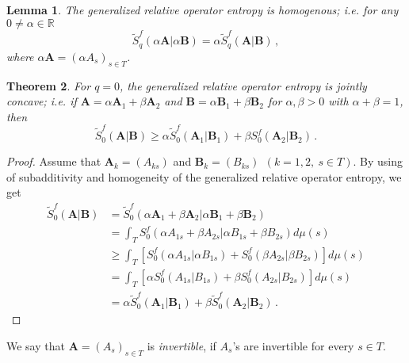 \documentclass[12pt, reqno]{amsart}
\newtheorem{theorem}{Theorem}[section]
\newtheorem{lemma}[theorem]{Lemma}
\theoremstyle{definition}
\theoremstyle{remark}
\numberwithin{equation}{section}
\begin{document}
\begin{lemma}\label{2.9}
The generalized relative operator entropy is homogenous; i.e. for any $0\neq \alpha \in \mathbb R$
$$
\widetilde{S}_q^f(\alpha\mathbf A|\alpha\mathbf B)=\alpha \widetilde{S}_q^f(\mathbf A|\mathbf B)\,,
$$
where $\alpha\mathbf A=(\alpha A_s)_{s\in T}$.
\end{lemma}
\begin{theorem}\label{t4}
For $q=0$, the generalized relative operator entropy is jointly concave; i.e. if $\mathbf{A}=\alpha \mathbf{A}_1+\beta \mathbf{A}_2$ and $\mathbf{B}=\alpha \mathbf{B}_1+\beta \mathbf{B}_2$ for $\alpha, \beta >0$ with $\alpha+\beta=1$, then
$$
\widetilde{S}_0^f(\mathbf{A}|\mathbf{B}) \ge \alpha \widetilde{S}_0^f(\mathbf{A}_1|\mathbf{B}_1)+\beta S_0^f(\mathbf{A}_2|\mathbf{B}_2)\,.
$$
\end{theorem}
\begin{proof}
Assume that $\mathbf{A}_k=(A_{ks})$ and $\mathbf{B}_k=(B_{ks})~~(k=1, 2,~s\in T)$. By using of subadditivity and homogeneity of the generalized relative operator entropy, we get
\begin{align*}
\widetilde{S}_0^f(\mathbf{A}|\mathbf{B})&=\widetilde{S}_0^f(\alpha \mathbf{A}_1+\beta \mathbf{A}_2|\alpha \mathbf{B}_1+\beta \mathbf{B}_2)\\
&=\int_T S_0^f(\alpha A_{1s}+\beta A_{2s}|\alpha B_{1s}+\beta B_{2s})d\mu(s)\\
& \ge \int_T\left[S_0^f(\alpha A_{1s}|\alpha B_{1s})+S_0^f(\beta A_{2s}|\beta B_{2s})\right]d\mu(s)\\
& = \int_T\left[\alpha S_0^f(A_{1s}|B_{1s})+\beta S_0^f(A_{2s}|B_{2s})\right]d\mu(s)\\
&= \alpha \widetilde{S}_0^f(\mathbf{A}_1|\mathbf{B}_1)+\beta \widetilde{S}_0^f(\mathbf{A}_2|\mathbf{B}_2)\,.
\end{align*}
\end{proof}

We say that $\mathbf{A}=(A_s)_{s\in T}$ is \textit{invertible}, if $A_s$'s are invertible for every $s\in T$.
\end{document}
